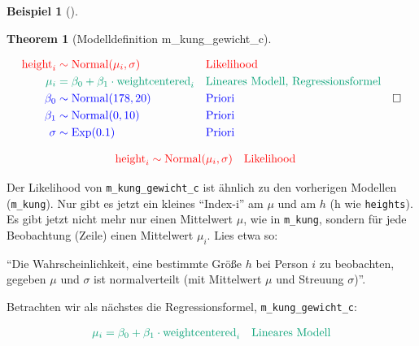 \documentclass[
  ngerman,
  letterpaper,
  twoside,
  open=any]{scrbook}
\theoremstyle{definition}
\newtheorem{example}{Beispiel}[chapter]
\theoremstyle{plain}
\newtheorem{theorem}{Theorem}[chapter]
\theoremstyle{definition}
\theoremstyle{definition}
\theoremstyle{remark}
\begin{document}
\begin{example}[]
\begin{theorem}[Modelldefinition
m\_kung\_gewicht\_c]\protect\hypertarget{thm-modm42}{}\label{thm-modm42}

\[\begin{aligned}
\color{red}{\text{height}_i} & \color{red}\sim \color{red}{\operatorname{Normal}(\mu_i, \sigma)} && \color{red}{\text{Likelihood}} \\
\color[RGB]{0,158,115}{\mu_i} & \color[RGB]{0,158,115}= \color[RGB]{0,158,115}{\beta_0 + \beta_1\cdot \text{weightcentered}_i}  && \color[RGB]{0,158,115}{\text{Lineares Modell, Regressionsformel} } \\
\color{blue}{\beta_0} & \color{blue}\sim \color{blue}{\operatorname{Normal}(178, 20)} && \color{blue}{\text{Priori}} \\
\color{blue}{\beta_1}  & \color{blue}\sim \color{blue}{\operatorname{Normal}(0, 10)}  && \color{blue}{\text{Priori}}\\
\color{blue}\sigma & \color{blue}\sim \color{blue}{\operatorname{Exp}(0.1)}  && \color{blue}{\text{Priori}}
\end{aligned}\quad \square\]

\end{theorem}

\[
\begin{aligned}
\color{red}{\text{height}_i} & \color{red}\sim \color{red}{\operatorname{Normal}(\mu_i, \sigma)} && \color{red}{\text{Likelihood}}
\end{aligned}
\]

Der Likelihood von \texttt{m\_kung\_gewicht\_c} ist ähnlich zu den
vorherigen Modellen (\texttt{m\_kung}). Nur gibt es jetzt ein kleines
\enquote{Index-i} am \(\mu\) und am \(h\) (h wie \texttt{heights}). Es
gibt jetzt nicht mehr nur einen Mittelwert \(\mu\), wie in
\texttt{m\_kung}, sondern für jede Beobachtung (Zeile) einen Mittelwert
\(\mu_i\). Lies etwa so:

\begin{displayquote}
\enquote{Die Wahrscheinlichkeit, eine bestimmte Größe \(h\) bei Person
\(i\) zu beobachten, gegeben \(\mu\) und \(\sigma\) ist normalverteilt
(mit Mittelwert \(\mu\) und Streuung \(\sigma\))}.
\end{displayquote}

Betrachten wir als nächstes die Regressionsformel,
\texttt{m\_kung\_gewicht\_c}:

\[
\begin{aligned}
\color[RGB]{0,158,115}{\mu_i} & \color[RGB]{0,158,115}= \color[RGB]{0,158,115}{\beta_0 + \beta_1\cdot \text{weightcentered}_i}  && \color[RGB]{0,158,115}{\text{Lineares Modell} } \\
\end{aligned}
\]


\end{example}
\end{document}
